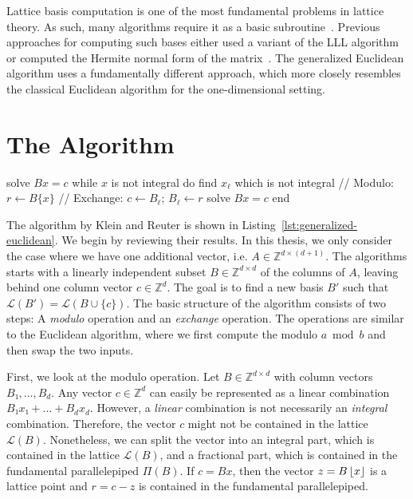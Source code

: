 Lattice basis computation is one of the most fundamental problems in lattice theory.
As such, many algorithms require it as a basic subroutine~\cite{Ajtai96,Gentry08}.
Previous approaches for computing such bases either used a variant of the LLL
algorithm~\cite{Lenstra82} or computed the Hermite normal form of the
matrix~\cite{Storjohann96}.
The generalized Euclidean algorithm uses a fundamentally different approach,
which more closely resembles the classical Euclidean algorithm for the
one-dimensional setting.

\section{The Algorithm}
\label{sec:generalized-euclidean}

\begin{Pseudocode}[
    float=tb,
    label={lst:generalized-euclidean},
    caption={
      The Generalized Euclidean Algorithm \cite{Klein24},
      which given a basis $B$ and vector $c$
      finds a new basis $B'$ which generates the same lattice.
      It works in two steps: Modulo and exchange.
    }]
solve $Bx = c$
while $x$ is not integral do
  find $x_ℓ$ which is not integral
  // Modulo:
  $r ← B\{x\}$
  // Exchange:
  $c ← B_ℓ$; $B_ℓ ← r$
  solve $Bx = c$
end
\end{Pseudocode}

The algorithm by Klein and Reuter is shown in Listing~\ref{lst:generalized-euclidean}.
We begin by reviewing their results.
In this thesis, we only consider the case where we have one additional vector,
i.e. $A ∈ ℤ^{d×(d+1)}$.
The algorithms starts with a linearly independent subset $B ∈ ℤ^{d × d}$ of the
columns of $A$, leaving behind one column vector $c ∈ ℤ^d$.
The goal is to find a new basis $B'$ such that $\mathcal L(B') = \mathcal L(B ∪ \{c\})$.
The basic structure of the algorithm consists of two steps:
A \emph{modulo} operation and an \emph{exchange} operation.
The operations are similar to the Euclidean algorithm, where we first compute
the modulo $a \bmod b$ and then swap the two inputs.

First, we look at the modulo operation.
Let $B ∈ ℤ^{d×d}$ with column vectors $B₁, …, B_d$.
Any vector $c ∈ ℤ^d$ can easily be represented
as a linear combination $B₁x₁ + \dots + B_d x_d$.
However, a \emph{linear} combination is not necessarily an \emph{integral} combination.
Therefore, the vector $c$ might not be contained in the lattice $\mathcal L(B)$.
Nonetheless, we can split the vector into an integral part,
which is contained in the lattice $\mathcal L(B)$,
and a fractional part,
which is contained in the fundamental parallelepiped $Π(B)$.
If $c = Bx$, then the vector $z = B \left\lfloor x\right\rfloor$ is a lattice point
and $r = c - z$ is contained in the fundamental parallelepiped.

